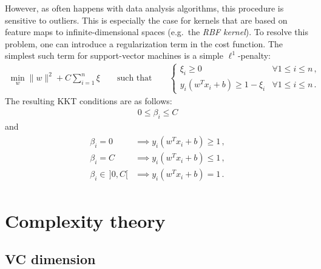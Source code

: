     However, as often happens with data analysis algorithms, this procedure is sensitive to outliers. This is especially the case for kernels that are based on feature maps to infinite-dimensional spaces (e.g.~the \textit{RBF kernel}). To resolve this problem, one can introduce a regularization term in the cost function. The simplest such term for support-vector machines is a simple $\ell^1$-penalty:
    \begin{gather}
        \min_w\|w\|^2 + C\sum_{i=1}^n\xi \qquad\text{such that}\qquad
        \begin{cases}
            \xi_i\geq0&\forall 1\leq i\leq n\,,\\
            y_i(w^Tx_i+b)\geq1-\xi_i&\forall 1\leq i\leq n\,.
        \end{cases}
    \end{gather}
    The resulting KKT conditions are as follows:
    \begin{gather}
        0\leq\beta_i\leq C
    \end{gather}
    and
    \begin{gather}
        \begin{aligned}
            \beta_i = 0&\implies y_i(w^Tx_i+b)\geq1\,,\\
            \beta_i = C&\implies y_i(w^Tx_i+b)\leq1\,,\\
            \beta_i\in\,]0,C[&\implies y_i(w^Tx_i+b)=1\,.
        \end{aligned}
    \end{gather}


\section{Complexity theory}
\subsection{VC dimension}

